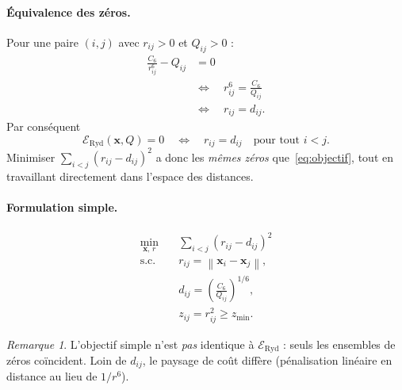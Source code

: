 \documentclass[11pt,a4paper]{article}
\theoremstyle{definition}
\theoremstyle{remark}
\newtheorem{remark}[theorem]{Remarque}
\newcommand{\norm}[1]{\left\|#1\right\|}
\newcommand{\Eryd}{\mathcal{E}_{\mathrm{Ryd}}}
\newcommand{\cSix}{C_6}
\begin{document}
\paragraph{Équivalence des zéros.}
Pour une paire $(i,j)$ avec $r_{ij}>0$ et $Q_{ij}>0$ :
\begin{align}
  \frac{\cSix}{r_{ij}^6} - Q_{ij}
  &=
  0
  \\
  &\Longleftrightarrow
  \quad
  r_{ij}^6
  =
  \frac{\cSix}{Q_{ij}}
  \\
  &\Longleftrightarrow
  \quad
  r_{ij}
  =
  d_{ij}.
\end{align}
Par conséquent
\begin{equation}
  \Eryd(\mathbf{x},Q)
  =
  0
  \quad\Longleftrightarrow\quad
  r_{ij}
  =
  d_{ij}
  \quad
  \text{pour tout } i<j.
\end{equation}
Minimiser $\sum_{i<j}(r_{ij}-d_{ij})^2$ a donc les \emph{mêmes zéros}
que~\eqref{eq:objectif}, tout en travaillant directement dans l'espace
des distances.

\paragraph{Formulation simple.}
\begin{equation}
  \boxed{
  \begin{aligned}
    \min_{\mathbf{x},\,r}
    &\quad
    \sum_{i<j}
    (r_{ij}-d_{ij})^2
    \\
    \text{s.c.}
    &\quad
    r_{ij}
    =
    \norm{\mathbf{x}_i-\mathbf{x}_j},
    \\
    &\quad
    d_{ij}
    =
    \left(
      \frac{\cSix}{Q_{ij}}
    \right)^{1/6},
    \\
    &\quad
    z_{ij}
    =
    r_{ij}^2
    \geq
    z_{\min}.
  \end{aligned}
  }
  \label{eq:simple}
\end{equation}

\begin{remark}
L'objectif simple n'est \emph{pas} identique à $\Eryd$ : seuls les
ensembles de zéros coïncident. Loin de $d_{ij}$, le paysage de coût
diffère (pénalisation linéaire en distance au lieu de $1/r^6$).
\end{remark}
\end{document}
